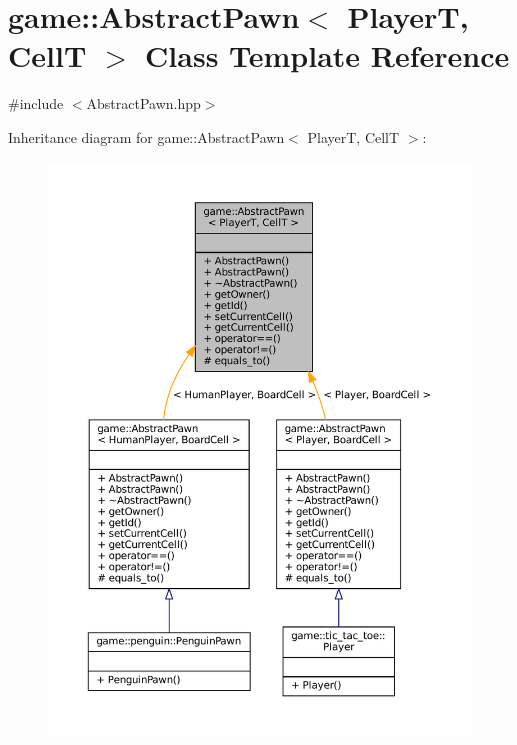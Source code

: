 \hypertarget{classgame_1_1_abstract_pawn}{}\section{game\+:\+:Abstract\+Pawn$<$ PlayerT, CellT $>$ Class Template Reference}
\label{classgame_1_1_abstract_pawn}


{\ttfamily \#include $<$Abstract\+Pawn.\+hpp$>$}



Inheritance diagram for game\+:\+:Abstract\+Pawn$<$ PlayerT, CellT $>$\+:
\nopagebreak
\begin{figure}[H]
\begin{center}
\leavevmode
\includegraphics[width=350pt]{classgame_1_1_abstract_pawn__inherit__graph}
\end{center}
\end{figure}


